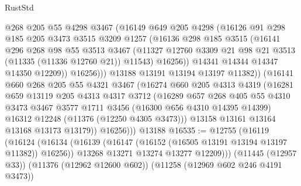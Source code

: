 \begin{lexlean}{RustStd}
\begin{coremodule}
{\begin{coremodule}
{{{{{{{{{{{{{{{{{{{{{{{{{{{{{{{{{{{{{{{{{{{{{{{{{{{{{{{{{{{{{{{{{{{{{{{{{{{{{{{{{{{{{                  @268
                  @205
                  @55
                  @4298
                  @3467
                  (@16149
                    @649
                    @205
                    @4298
                    (@16126
                      @91
                      @298
                      @185
                      @205
                      @3473
                      @3515
                      @3209
                      @1257
                      (@16136
                        @298
                        @185
                        @3515
                        (@16141
                          @296
                          @268
                          @98
                          @55
                          @3513
                          @3467
                          (@11327
                            @12760
                            @3309
                            @21
                            @98
                            @21
                            @3513
                            (@11335 (@11336 @12760 @21))
                            @11543)
                          @16256))
                      @14341
                      @14344
                      @14347
                      @14350
                      @12209))
                  @16256)))
            @13188
            @13191
            @13194
            @13197
            @11382))
        (@16141
          @660
          @268
          @205
          @55
          @4321
          @3467
          (@16274
            @660
            @205
            @4313
            @4319
            (@16281
              @659
              @13119
              @205
              @4313
              @4317
              @3712
              (@16289
                @657
                @268
                @405
                @55
                @4310
                @3473
                @3467
                @3577
                @1711
                @3456
                (@16300 @656 @4310 @14395 @14399)
                @16312
                @12248
                (@11376 (@12250 @4305 @3473)))
              @13158
              @13161
              @13164
              @13168
              @13173
              @13179))
          @16256)))
    @13188
@16535 := @12755
    (@16119
      (@16124
        (@16134
          (@16139 (@16147 (@16152 (@16505 @13191 @13194 @13197 @11382)) @16256))
          @13268
          @13271
          @13274
          @13277
          @12209)))
    (@11445 (@12957 @33))
    (@11376 (@12962 @12600 @602))
    (@11258 (@12969 @602 @246 @4191 @3473))
}}}}}}}}}}}}}}}}}}}}}}}}}}}}}}}}}}}}}}}}}}}}}}}}}}}}}}}}}}}}}}}}}}}}}}}}}}}}}}}}}}}}}
\end{coremodule}}
\end{coremodule}
\end{lexlean}
